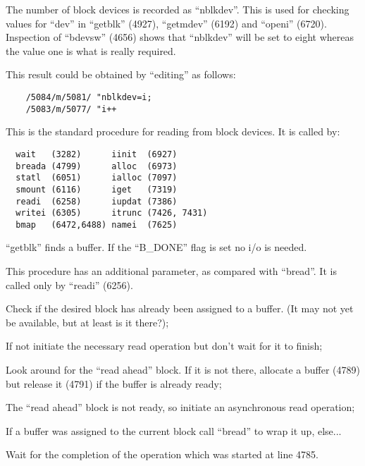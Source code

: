 The number of block devices is recorded
as ``nblkdev''. This is used for checking
values for ``dev'' in ``getblk'' (4927),
``getmdev'' (6192) and ``openi'' (6720).
Inspection of ``bdevsw'' (4656) shows
that ``nblkdev'' will be set to eight
whereas the value one is what is really
required.

This result could be obtained by ``editing'' as follows:

\begin{verbatim}
    /5084/m/5081/ "nblkdev=i;
    /5083/m/5077/ "i++
\end{verbatim}


This is the standard procedure for
reading from block devices. It is
called by:

\begin{verbatim}
  wait   (3282)      iinit  (6927)
  breada (4799)      alloc  (6973)
  statl  (6051)      ialloc (7097)
  smount (6116)      iget   (7319)
  readi  (6258)      iupdat (7386)
  writei (6305)      itrunc (7426, 7431)
  bmap   (6472,6488) namei  (7625) 
\end{verbatim}

``getblk'' finds a buffer. If the
``B\_DONE'' flag is set no i/o is needed.


This procedure has an additional parameter, as compared with ``bread''. It is
called only by ``readi'' (6256).

\bd
\item[4780:] Check if the desired block has
 already been assigned to a
 buffer. (It may not yet be
 available, but at least is it
 there?);

\item[4781:] If not initiate the necessary
read operation but don't wait for
it to finish;

\item[4788:] Look around for the ``read ahead''
 block. If it is not there, allocate a buffer (4789) but release
 it (4791) if the buffer is
 already ready;

\item[4793:] The ``read ahead'' block is not
 ready, so initiate an asynchronous read operation;

\item[4798:] If a buffer was assigned to the
 current block call ``bread'' to
 wrap it up, else...

\item[4800:] Wait for the completion of the
 operation which was started at
 line 4785.
\ed



